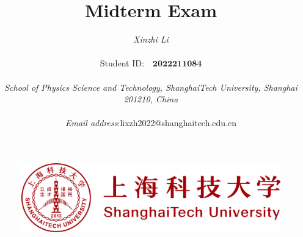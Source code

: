 \documentclass[a4paper,11pt]{article}
\begin{document}
\pagestyle{fancy}
\title{\textbf{\Huge{Midterm Exam}}}

\author{\textit{Xinzhi Li} \\\quad\\Student ID:~~$\boldsymbol{2022211084}$\\\quad\\ \textit{School of Physics Science and Technology, ShanghaiTech University, Shanghai 201210, China}\\\quad \\ \textit{Email address}:\quad lixzh2022@shanghaitech.edu.cn}


\begin{figure}[t]
\centering
\includegraphics[width=1\columnwidth]{logo/row.png}
\end{figure}

\maketitle\thispagestyle{empty}
\newpage
\setcounter{page}{1}
\end{document}

